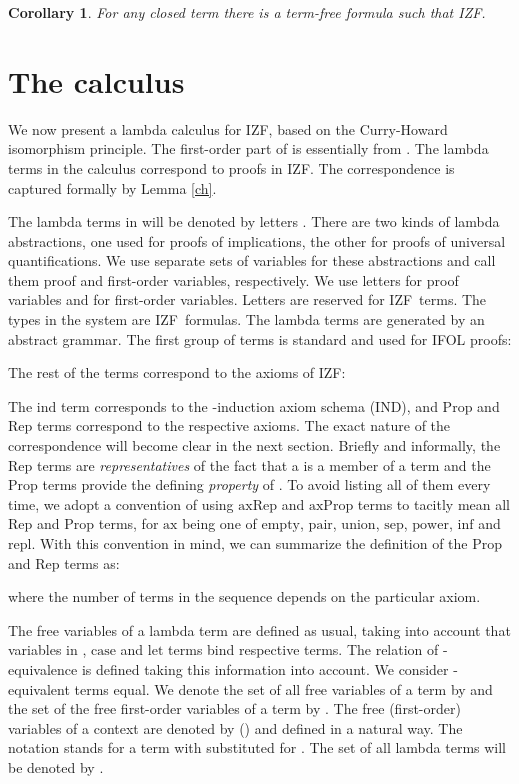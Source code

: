 \documentclass{LMCS}
\newtheorem{corollary}[thm]{Corollary}
\newcommand{\pl}[1]{\ensuremath{\mathrm{#1}}}
\newcommand{\izfr}{IZF}
\newcommand{\iizfr}{IZF}
\begin{document}
\begin{corollary}\label{tdef}
For any closed term  there is a term-free formula  such that \izfr .
\end{corollary}

\section{The  calculus}\label{lz}

We now present a lambda calculus  for \iizfr, based on the Curry-Howard isomorphism
principle. The first-order part of  is essentially  from
\cite{urzy}. The lambda terms in the calculus correspond to proofs in \iizfr.
The correspondence is captured formally by Lemma \ref{ch}. 

The lambda terms in  will be denoted by letters . 
There are two kinds of lambda abstractions, one used for proofs of implications, the other for proofs of
universal quantifications. We use separate sets of variables for these abstractions and call them
proof and first-order variables, respectively. We use letters  for proof variables and  for first-order variables. 
Letters  are reserved for \izfr\ terms. The types in the system are
\izfr\ formulas. The lambda terms are generated by an abstract grammar. The
first group of terms is standard and used for IFOL proofs:

The rest of the terms correspond to the axioms of \iizfr:








The \pl{ind} term corresponds to the -induction axiom schema (IND),
and \pl{Prop} and \pl{Rep} terms correspond to the respective axioms.
The exact nature of the correspondence will become clear in the next
section. Briefly and informally, the \pl{Rep} terms are
\emph{representatives} of the fact that a  is a member of a term
 and the \pl{Prop} terms provide the defining \emph{property} of
. To avoid listing all of them every
time, we adopt a convention of using \pl{axRep} and \pl{axProp} terms to tacitly
mean all \pl{Rep} and \pl{Prop} terms, for \pl{ax} being one of \pl{empty}, \pl{pair}, \pl{union},
\pl{sep}, \pl{power}, \pl{inf} and \pl{repl}. With this convention in mind, we can summarize the
definition of the \pl{Prop} and \pl{Rep} terms as:

where the number of terms in the sequence  depends on the particular
axiom. 

The free variables of a lambda term are defined as usual, taking into
account that variables in , \pl{case} and \pl{let} terms bind respective
terms. The relation of  -equivalence is defined taking this information into account. We consider -equivalent terms equal.
We denote the set of all free variables of a term  by  and the set
of the free first-order variables of a term by . The free (first-order) variables of a context 
are denoted by  () and defined in a natural way. The
notation  stands for a term  with  substituted for . 
The set of all  lambda terms will be denoted by . 
\end{document}
